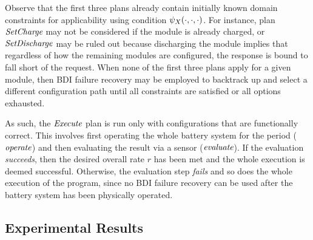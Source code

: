 Observe that the first three plans already contain initially known domain constraints for applicability using condition $\psi_X(\cdot,\cdot,\cdot)$. For instance, plan $\operatorname{\textit{SetCharge}}$ may not be considered if the module is already charged, or $\operatorname{\textit{SetDischarge}}$ may be ruled out because discharging the module implies that regardless of how the remaining modules are configured, the response is bound to fall short of the request. When none of the first three plans apply for a given module, then BDI failure recovery may be employed to backtrack up and select a different configuration path until all constraints are satisfied or all options exhausted. 

As such, the $\operatorname{\textit{Execute}}$ plan is run only with configurations that are functionally correct. This involves first operating the whole battery system for the period ($\operatorname{\textit{operate}}$) and then evaluating the result via a sensor ($\operatorname{\textit{evaluate}}$). If the evaluation \emph{succeeds}, then the desired overall rate $r$ has been met and the whole execution is deemed successful. Otherwise, the evaluation step \emph{fails} and so does the whole execution of the program, since no BDI failure recovery can be used after the battery system has been physically operated. 


\subsection{Experimental Results}\label{sec:results}

